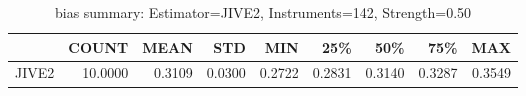 \begin{table}[ht]
\centering
\caption{bias summary: Estimator=JIVE2, Instruments=142, Strength=0.50}
\begin{tabular}{lrrrrrrrr}
\toprule
 & COUNT & MEAN & STD & MIN & 25\% & 50\% & 75\% & MAX \\
\midrule
JIVE2 & 10.0000 & 0.3109 & 0.0300 & 0.2722 & 0.2831 & 0.3140 & 0.3287 & 0.3549 \\
\bottomrule
\end{tabular}
\end{table}
